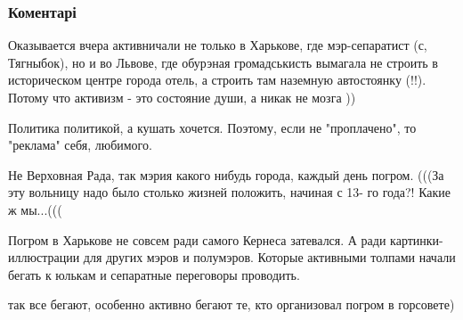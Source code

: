  
 
 
 
 
\subsubsection{Коментарі}

\begin{itemize} %

Оказывается вчера активничали не только в Харькове, где мэр-сепаратист (с,
Тягныбок), но и во Львове, где обурэная громадськисть вымагала не строить в
историческом центре города отель, а строить там наземную автостоянку (!!).
Потому что активизм - это состояние души, а никак не мозга ))

Политика политикой, а кушать хочется. Поэтому, если не "проплачено", то "реклама" себя, любимого.


Не Верховная Рада, так мэрия какого нибудь города, каждый день погром. (((За эту
вольницу надо было столько жизней положить, начиная с 13- го года?! Какие ж
мы...(((


Погром в Харькове не совсем ради самого Кернеса затевался. А ради
картинки-иллюстрации для других мэров и полумэров. Которые активными толпами
начали бегать к юлькам и сепаратные переговоры проводить.

так все бегают, особенно активно бегают те, кто организовал погром в горсовете)

\end{itemize} %
